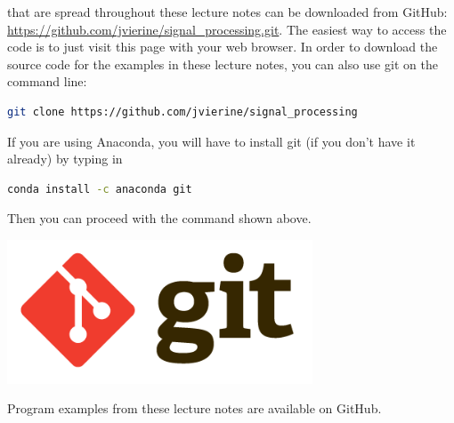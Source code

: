  that are spread throughout these lecture
notes can be downloaded from GitHub:
\url{https://github.com/jvierine/signal_processing.git}. The easiest
way to access the code is to just visit this page with your web
browser. In order to download the source code for the examples in
these lecture notes, you can also use git on the command line:
\begin{lstlisting}[language=sh,caption=Obtaining the source code for the programming examples with git,label=lst:download]
git clone https://github.com/jvierine/signal_processing
\end{lstlisting}
If you are using Anaconda, you will have to install git (if you don't
have it already) by typing in
\begin{lstlisting}[language=sh,caption=Obtaining the source code for the programming examples with git,label=lst:download]
  conda install -c anaconda git
\end{lstlisting}
Then you can proceed with the command shown above. 

\begin{marginfigure}
\includegraphics[width=0.68\textwidth]{ch02/figures/gitlogo.png}
\caption{Program examples from these lecture notes are available on GitHub.}
\end{marginfigure}
